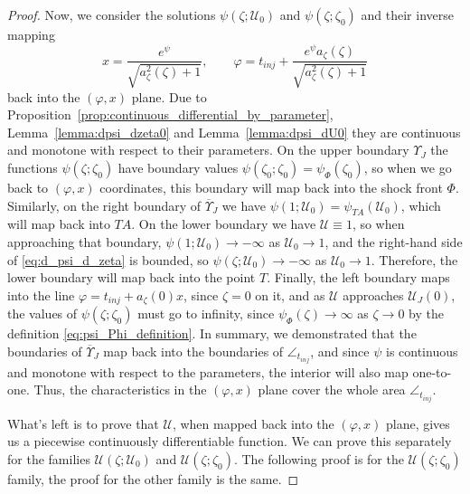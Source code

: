 \documentclass[12pt]{article}
\theoremstyle{definition}
\begin{document}
\begin{proof}
Now, we consider the solutions $\psi(\zeta; \mathcal U_0)$ and $\psi(\zeta; \zeta_0)$ and their inverse mapping
\[
x = \frac{e^\psi}{\sqrt{a_\zeta^2(\zeta) + 1}}, \qquad \varphi = t_{inj} + \frac{e^{\psi}a_\zeta(\zeta)}{\sqrt{a_\zeta^2(\zeta) + 1}}
\]
back into the $(\varphi, x)$ plane. Due to Proposition~\ref{prop:continuous_differential_by_parameter}, Lemma~\ref{lemma:dpsi_dzeta0} and Lemma~\ref{lemma:dpsi_dU0} they are continuous and monotone with respect to their parameters. On the upper boundary $\Upsilon_J$ the functions $\psi(\zeta; \zeta_0)$ have boundary values $\psi(\zeta_0; \zeta_0) = \psi_\Phi(\zeta_0)$, so when we go back to $(\varphi, x)$ coordinates, this boundary will map back into the shock front $\Phi$. Similarly, on the right boundary of $\overline{\Upsilon}_J$ we have $\psi(1; \mathcal U_0) = \psi_{TA}(\mathcal U_0)$, which will map back into $TA$. On the lower boundary we have $\mathcal U \equiv 1$, so when approaching that boundary, $\psi(1; \mathcal U_0) \to -\infty$ as $\mathcal U_0\to 1$, and the right-hand side of \eqref{eq:d_psi_d_zeta} is bounded, so $\psi(\zeta; \mathcal U_0) \to -\infty$ as $\mathcal U_0\to 1$. Therefore, the lower boundary will map back into the point $T$. Finally, the left boundary maps into the line $\varphi = t_{inj}+a_\zeta(0)x$, since $\zeta = 0$ on it, and as $\mathcal U$ approaches $\mathcal U_J(0)$, the values of $\psi(\zeta; \zeta_0)$ must go to infinity, since $\psi_\Phi(\zeta) \to \infty$ as $\zeta\to 0$ by the definition \eqref{eq:psi_Phi_definition}.
In summary, we demonstrated that the boundaries of $\overline{\Upsilon}_J$ map back into the boundaries of $\angle_{t_{inj}}$, and since $\psi$ is continuous and monotone with respect to the parameters, the interior will also map one-to-one. Thus, the characteristics in the $(\varphi, x)$ plane cover the whole area $\angle_{t_{inj}}$.

What's left is to prove that $\mathcal U$, when mapped back into the $(\varphi, x)$ plane, gives us a piecewise continuously differentiable function. We can prove this separately for the families $\mathcal U(\zeta; \mathcal U_0)$ and $\mathcal U(\zeta; \zeta_0)$. The following proof is for the $\mathcal U(\zeta; \zeta_0)$ family, the proof for the other family is the same.


\end{proof}
\end{document}
